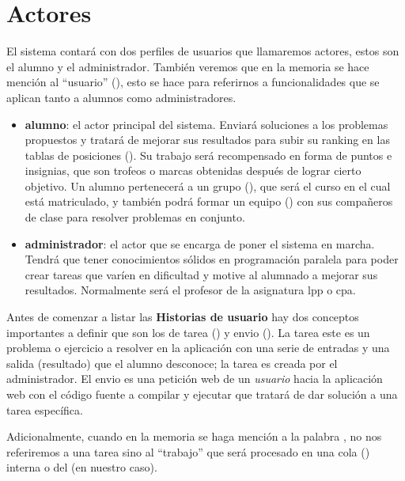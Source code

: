 \documentclass[11pt,spanish,listoffigures,listoftables]{tfgetsinf}
\begin{document}
\section{Actores}

El sistema contará con dos perfiles de usuarios que llamaremos actores, estos son el \Gls{alumno} y el \Gls{administrador}. También veremos que en la memoria se hace mención al ``usuario'' (), esto se hace para referirnos a funcionalidades que se aplican tanto a \gls{alumno}s como \gls{administrador}es.

\begin{itemize}
    \item \textbf{\gls{alumno}}: el actor principal del sistema. Enviará soluciones a los problemas propuestos y tratará de mejorar sus resultados para subir su ranking en las tablas de posiciones (). Su trabajo será recompensado en forma de puntos e insignias, que son trofeos o marcas obtenidas después de lograr cierto objetivo. Un alumno pertenecerá a un \gls{grupo} (), que será el curso en el cual está matriculado, y también podrá formar un \gls{equipo} () con sus compañeros de clase para resolver problemas en conjunto.
	\item \textbf{\gls{administrador}}: el actor que se encarga de poner el sistema en marcha. Tendrá que tener conocimientos sólidos en programación paralela para poder crear \gls{tarea}s que varíen en dificultad y motive al alumnado a mejorar sus resultados. Normalmente será el profesor de la asignatura \acrshort{lpp} o \acrshort{cpa}.
\end{itemize}

Antes de comenzar a listar las \textbf{Historias de usuario} hay dos conceptos importantes a definir que son los de \gls{tarea} () y \gls{envio} (). La \gls{tarea} este es un problema o ejercicio a resolver en la aplicación con una serie de entradas y una salida (resultado) que el \gls{alumno} desconoce; la \gls{tarea} es creada por el \gls{administrador}. El \gls{envio} es una petición web de un \textit{usuario} hacia la aplicación web con el código fuente a compilar y ejecutar que tratará de dar solución a una \gls{tarea} específica. 

Adicionalmente, cuando en la memoria se haga mención a la palabra , no nos referiremos a una \gls{tarea} sino al ``trabajo'' que será procesado en una cola () interna o del  (\kahan en nuestro caso).
\end{document}
